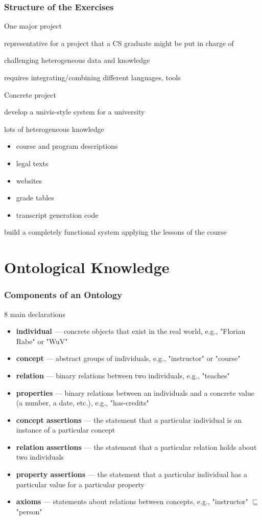\documentclass{beamer}
\begin{document}
\begin{frame}\frametitle{Structure of the Exercises}
\begin{blockitems}{One major project}
\item representative for a project that a CS graduate might be put in charge of
\item challenging heterogeneous data and knowledge
\item requires integrating/combining different languages, tools
\end{blockitems}

\begin{blockitems}{Concrete project}
\item develop a univis-style system for a university
\item lots of heterogeneous knowledge
 \begin{itemize}
 \item course and program descriptions
 \item legal texts
 \item websites
 \item grade tables
 \item transcript generation code
 \end{itemize} 
\item build a completely functional system applying the lessons of the course
\end{blockitems}
\end{frame}

\section{Ontological Knowledge}

\begin{frame}\frametitle{Components of an Ontology}
8 main declarations
\begin{itemize}
 \item \textbf{individual} --- concrete objects that exist in the real world, e.g., "Florian Rabe" or "WuV"
 \item \textbf{concept} --- abstract groups of individuals, e.g., "instructor" or "course"
 \item \textbf{relation} --- binary relations between two individuals, e.g., "teaches"
 \item \textbf{properties} --- binary relations between an individuals and a concrete value (a number, a date, etc.), e.g., "has-credits"
 \item \textbf{concept assertions} --- the statement that a particular individual is an instance of a particular concept
 \item \textbf{relation assertions} --- the statement that a particular relation holds about two individuals
 \item \textbf{property assertions} --- the statement that a particular individual has a particular value for a particular property
 \item \textbf{axioms} --- statements about relations between concepts, e.g., "instructor" $\sqsubseteq$ "person"
\end{itemize}
\end{frame}
\end{document}
